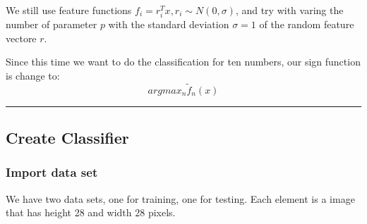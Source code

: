 \documentclass[11pt]{article}
\begin{document}
We still use feature functions
\(f_{i} = r_{i}^{T}x, r_{i} \sim N(0, \sigma)\), and try with varing the
number of parameter \(p\) with the standard deviation \(\sigma = 1\) of
the random feature vectore \(r\).

Since this time we want to do the classification for ten numbers, our
sign function is change to: \[ argmax_{n} \tilde{f}_{n}(x)\]

\begin{center}\rule{0.5\linewidth}{\linethickness}\end{center}

    \subsection{Create Classifier}\label{create-classifier}

\subsubsection{Import data set}\label{import-data-set}

We have two data sets, one for training, one for testing. Each element
is a image that has height 28 and width 28 pixels.
\end{document}
